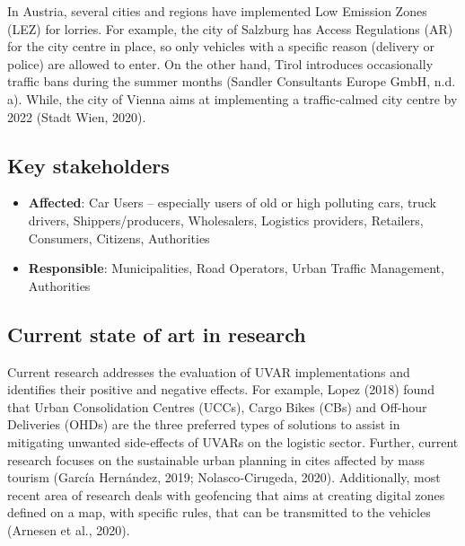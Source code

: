 \documentclass[
]{book}
\providecommand{\tightlist}{%
  \setlength{\itemsep}{0pt}\setlength{\parskip}{0pt}}
\begin{document}
In Austria, several cities and regions have implemented Low Emission Zones (LEZ) for lorries. For example, the city of Salzburg has Access Regulations (AR) for the city centre in place, so only vehicles with a specific reason (delivery or police) are allowed to enter. On the other hand, Tirol introduces occasionally traffic bans during the summer months (Sandler Consultants Europe GmbH, n.d. a). While, the city of Vienna aims at implementing a traffic-calmed city centre by 2022 (Stadt Wien, 2020).

\hypertarget{key-stakeholders-5}{%
\subsection*{Key stakeholders}\label{key-stakeholders-5}}

\begin{itemize}
\tightlist
\item
  \textbf{Affected}: Car Users -- especially users of old or high polluting cars, truck drivers, Shippers/producers, Wholesalers, Logistics providers, Retailers, Consumers, Citizens, Authorities
\item
  \textbf{Responsible}: Municipalities, Road Operators, Urban Traffic Management, Authorities
\end{itemize}

\hypertarget{current-state-of-art-in-research-5}{%
\subsection*{Current state of art in research}\label{current-state-of-art-in-research-5}}

Current research addresses the evaluation of UVAR implementations and identifies their positive and negative effects. For example, Lopez (2018) found that Urban Consolidation Centres (UCCs), Cargo Bikes (CBs) and Off-hour Deliveries (OHDs) are the three preferred types of solutions to assist in mitigating unwanted side-effects of UVARs on the logistic sector. Further, current research focuses on the sustainable urban planning in cites affected by mass tourism (García Hernández, 2019; Nolasco‐Cirugeda, 2020). Additionally, most recent area of research deals with geofencing that aims at creating digital zones defined on a map, with specific rules, that can be transmitted to the vehicles (Arnesen et al., 2020).
\end{document}
